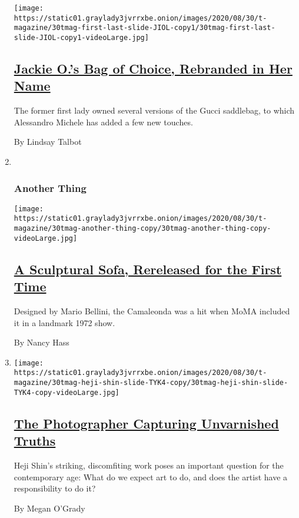 \begin{enumerate}
  \texttt{[image: https://static01.graylady3jvrrxbe.onion/images/2020/08/30/t-magazine/30tmag-first-last-slide-JIOL-copy1/30tmag-first-last-slide-JIOL-copy1-videoLarge.jpg]}

  \hypertarget{jackie-os-bag-of-choice-rebranded-in-her-name}{%
  \subsection{\texorpdfstring{\href{/2020/08/28/t-magazine/gucci-jackie-1961-saddlebag.html}{Jackie
  O.'s Bag of Choice, Rebranded in Her
  Name}}{Jackie O.'s Bag of Choice, Rebranded in Her Name}}\label{jackie-os-bag-of-choice-rebranded-in-her-name}}

  The former first lady owned several versions of the Gucci saddlebag,
  to which Alessandro Michele has added a few new touches.

  By Lindsay Talbot
\item ~
  \hypertarget{another-thing}{%
  \subsubsection{Another Thing}\label{another-thing}}

  \texttt{[image: https://static01.graylady3jvrrxbe.onion/images/2020/08/30/t-magazine/30tmag-another-thing-copy/30tmag-another-thing-copy-videoLarge.jpg]}

  \hypertarget{a-sculptural-sofa-rereleased-for-the-first-time}{%
  \subsection{\texorpdfstring{\href{/2020/08/28/t-magazine/bebitalia-camaleonda-sofa.html}{A
  Sculptural Sofa, Rereleased for the First
  Time}}{A Sculptural Sofa, Rereleased for the First Time}}\label{a-sculptural-sofa-rereleased-for-the-first-time}}

  Designed by Mario Bellini, the Camaleonda was a hit when MoMA included
  it in a landmark 1972 show.

  By Nancy Hass
\item
  \texttt{[image: https://static01.graylady3jvrrxbe.onion/images/2020/08/30/t-magazine/30tmag-heji-shin-slide-TYK4-copy/30tmag-heji-shin-slide-TYK4-copy-videoLarge.jpg]}

  \hypertarget{the-photographer-capturing-unvarnished-truths}{%
  \subsection{\texorpdfstring{\href{/2020/08/27/t-magazine/heji-shin-photographer-babies.html}{The
  Photographer Capturing Unvarnished
  Truths}}{The Photographer Capturing Unvarnished Truths}}\label{the-photographer-capturing-unvarnished-truths}}

  Heji Shin's striking, discomfiting work poses an important question
  for the contemporary age: What do we expect art to do, and does the
  artist have a responsibility to do it?

  By Megan O'Grady
\end{enumerate}

